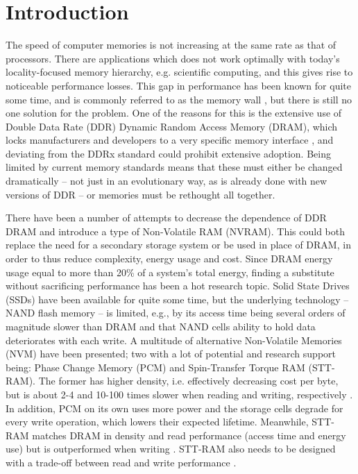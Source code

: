 \chapter{Introduction}
The speed of computer memories is not increasing at the same rate as that of processors. There are applications which does not work optimally with today's locality-focused memory hierarchy, e.g. scientific computing, and this gives rise to noticeable performance losses. This gap in performance has been known for quite some time, and is commonly referred to as the memory wall \cite{wulf1995hitting}, but there is still no one solution for the problem. One of the reasons for this is the extensive use of Double Data Rate (DDR) Dynamic Random Access Memory (DRAM), which locks manufacturers and developers to a very specific memory interface \cite{standard2008double}, and deviating from the DDRx standard could prohibit extensive adoption. Being limited by current memory standards means that these must either be changed dramatically -- not just in an evolutionary way, as is already done with new versions of DDR -- or memories must be rethought all together. 
\bigskip

There have been a number of attempts to decrease the dependence of DDR DRAM and introduce a type of Non-Volatile RAM (NVRAM). This could both replace the need for a secondary storage system or be used in place of DRAM, in order to thus reduce complexity, energy usage and cost. Since DRAM energy usage equal to more than 20\% of a system's total energy, finding a substitute without sacrificing performance has been a hot research topic\cite{4658649}. Solid State Drives (SSDs) have been available for quite some time, but the underlying technology -- NAND flash memory -- is limited, e.g., by its access time being several orders of magnitude slower than DRAM and that NAND cells ability to hold data deteriorates with each write. A multitude of alternative Non-Volatile Memories (NVM) have been presented; two with a lot of potential and research support being: Phase Change Memory (PCM) and Spin-Transfer Torque RAM (STT-RAM). The former has higher density, i.e. effectively decreasing cost per byte, but is about 2-4 and 10-100 times slower when reading and writing, respectively \cite{Qureshi:2009:SHP:1555754.1555760}\cite{5388621}. In addition, PCM on its own uses more power and the storage cells degrade for every write operation, which lowers their expected lifetime.  Meanwhile, STT-RAM matches DRAM in density and read performance (access time and energy use) but is outperformed when writing \cite{6557176}\cite{6027811}. STT-RAM also needs to be designed with a trade-off between read and write performance \cite{Wang_2013}\cite{Khvalkovskiy_2013}.
\bigskip

